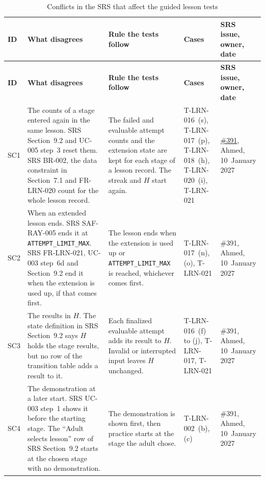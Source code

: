 \documentclass[12pt, titlepage]{article}
\begin{document}
{\small
\begin{longtable}{@{}l
  >{\raggedright\arraybackslash}p{}
  >{\raggedright\arraybackslash}p{}
  >{\raggedright\arraybackslash}p{}
  >{\raggedright\arraybackslash}p{}@{}}
\caption{Conflicts in the SRS that affect the guided lesson tests}
\label{tab:srs-conflicts}\\
\toprule
\textbf{ID} & \textbf{What disagrees} & \textbf{Rule the tests follow} &
\textbf{Cases} & \textbf{SRS issue, owner, date}\\
\midrule
\endfirsthead
\toprule
\textbf{ID} & \textbf{What disagrees} & \textbf{Rule the tests follow} &
\textbf{Cases} & \textbf{SRS issue, owner, date}\\
\midrule
\endhead
\bottomrule
\endlastfoot
SC1 & The counts of a stage entered again in the same lesson. SRS
Section~9.2 and UC-005 step~3 reset them. SRS BR-002, the data constraint
in Section~7.1 and FR-LRN-020 count for the whole lesson record. & The
failed and evaluable attempt counts and the extension state are kept for
each stage of a lesson record. The streak and $H$ start again. &
T-LRN-016~(s), T-LRN-017~(p), T-LRN-018~(h), T-LRN-020~(i), T-LRN-021 &
\href{https://github.com/AHMEDELZARIA/squigglr/issues/391}{\#391}, Ahmed,
10~January 2027\\
\addlinespace
SC2 & When an extended lesson ends. SRS SAF-RAY-005 ends it at
\texttt{ATTEMPT\_LIMIT\_MAX}. SRS FR-LRN-021, UC-003 step~6d and
Section~9.2 end it when the extension is used up, if that comes first. &
The lesson ends when the extension is used up or
\texttt{ATTEMPT\_LIMIT\_MAX} is reached, whichever comes first. &
T-LRN-017~(n), (o), T-LRN-021 & \#391, Ahmed, 10~January 2027\\
\addlinespace
SC3 & The results in $H$. The state definition in SRS Section~9.2 says $H$
holds the stage results, but no row of the transition table adds a result
to it. & Each finalized evaluable attempt adds its result to $H$. Invalid
or interrupted input leaves $H$ unchanged. & T-LRN-016~(f) to (j),
T-LRN-017, T-LRN-021 & \#391, Ahmed, 10~January 2027\\
\addlinespace
SC4 & The demonstration at a later start. SRS UC-003 step~1 shows it before
the starting stage. The ``Adult selects lesson'' row of SRS Section~9.2
starts at the chosen stage with no demonstration. & The demonstration is
shown first, then practice starts at the stage the adult chose. &
T-LRN-002~(b), (c) & \#391, Ahmed, 10~January 2027\\
\end{longtable}
}
\end{document}
